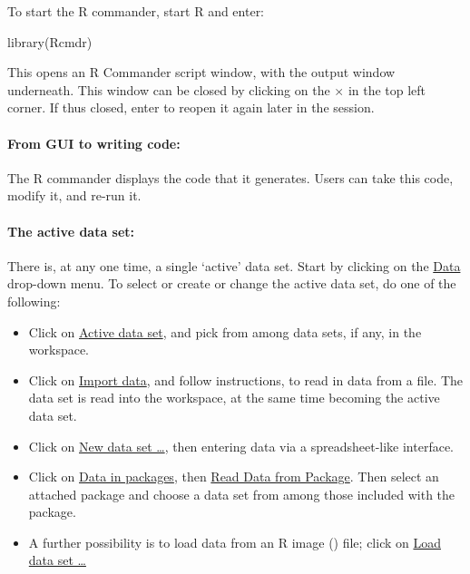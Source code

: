 






To start the R commander, start R and enter:
\begin{Schunk}
\begin{Sinput}
library(Rcmdr)
\end{Sinput}
\end{Schunk}
This opens an R Commander script window, with the output window
underneath.  
This window can be closed by clicking on the {\large
  \texttt{$\times$}} in the top left corner. If thus closed,
enter  to reopen it again later in the session.

\paragraph{From GUI to writing code:}
  The R commander
displays the code that it generates.  Users can take this code, modify
it, and re-run it.

\paragraph{The active data set:} There is, at any one time,
a single `active' data set. Start by clicking on the
\underline{Data} drop-down menu. To select
or create or change the active data set, do one of the following:
\begin{itemize}
\item Click on \underline{Active data set}, and pick from among data
  sets, if any, in the workspace.
\item Click on \underline{Import data}, and follow instructions, to
  read in data from a file.  The data set is read into the workspace,
  at the same time becoming the active data set.
\item Click on \underline{New data set \ldots}, then entering data via
  a spreadsheet-like interface.
\item Click on \underline{Data in packages}, then \underline{Read
    Data from Package}.  Then select an attached package and
  choose a data set from among those included with the
  package.
\item A further possibility is to load data from an R image
  () file; click on \underline{Load data set \ldots}
\end{itemize}

